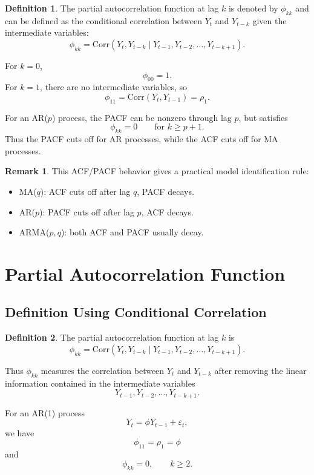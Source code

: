 \documentclass[12pt,oneside]{book}
\numberwithin{equation}{section}
\theoremstyle{definition}
\newtheorem{definition}{Definition}[section]
\newtheorem{remark}{Remark}[section]
\theoremstyle{plain}
\theoremstyle{remark}
\newcommand{\Corr}{\mathrm{Corr}}
\begin{document}
\begin{definition}
The partial autocorrelation function at lag $k$ is denoted by $\phi_{kk}$ and can be defined as the conditional correlation between $Y_t$ and $Y_{t-k}$ given the intermediate variables:
\[
\phi_{kk}
=
\Corr(Y_t,Y_{t-k}\mid Y_{t-1},Y_{t-2},\ldots,Y_{t-k+1}).
\]
\end{definition}

For $k=0$,
\[
\phi_{00}=1.
\]
For $k=1$, there are no intermediate variables, so
\[
\phi_{11}
=
\Corr(Y_t,Y_{t-1})
=
\rho_1.
\]

For an AR($p$) process, the PACF can be nonzero through lag $p$, but satisfies
\[
\phi_{kk}=0
\qquad
\text{for } k\geq p+1.
\]
Thus the PACF cuts off for AR processes, while the ACF cuts off for MA processes.

\begin{remark}
This ACF/PACF behavior gives a practical model identification rule:
\begin{itemize}
\item MA($q$): ACF cuts off after lag $q$, PACF decays.
\item AR($p$): PACF cuts off after lag $p$, ACF decays.
\item ARMA($p,q$): both ACF and PACF usually decay.
\end{itemize}
\end{remark}

\section{Partial Autocorrelation Function}

\subsection{Definition Using Conditional Correlation}

\begin{definition}
The partial autocorrelation function at lag $k$ is
\[
\phi_{kk}
=
\Corr(Y_t,Y_{t-k}\mid Y_{t-1},Y_{t-2},\ldots,Y_{t-k+1}).
\]
\end{definition}

Thus $\phi_{kk}$ measures the correlation between $Y_t$ and $Y_{t-k}$ after removing the linear information contained in the intermediate variables
\[
Y_{t-1},Y_{t-2},\ldots,Y_{t-k+1}.
\]

For an AR(1) process
\[
Y_t=\phi Y_{t-1}+\varepsilon_t,
\]
we have
\[
\phi_{11}=\rho_1=\phi
\]
and
\[
\phi_{kk}=0,
\qquad k\geq 2.
\]
\end{document}
